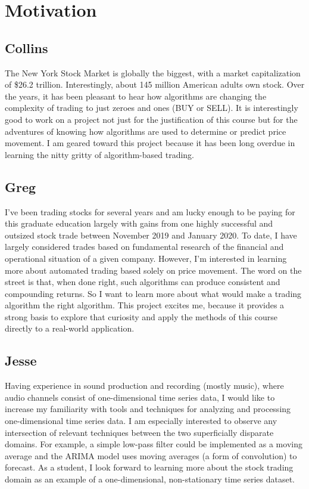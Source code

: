 \documentclass[12pt,english]{article}
\begin{document}
\section*{Motivation}
\subsection*{Collins}
The New York Stock Market is globally the biggest, with a market capitalization of \$26.2 trillion. Interestingly, about 145 million American adults own stock. Over the years, it has been pleasant to hear how algorithms are changing the complexity of trading to just zeroes and ones (BUY or SELL). It is interestingly good to work on a project not just for the justification of this course but for the adventures of knowing how algorithms are used to determine or predict price movement. I am geared toward this project because it has been long overdue in learning the nitty gritty of algorithm-based trading.
\subsection*{Greg}
I’ve been trading stocks for several years and am lucky enough to be paying for this graduate education largely with gains from one highly successful and outsized stock trade between November 2019 and January 2020. To date, I have largely considered trades based on fundamental research of the financial and operational situation of a given company. However, I’m interested in learning more about automated trading based solely on price movement. The word on the street is that, when done right, such algorithms can produce consistent and compounding returns. So I want to learn more about what would make a trading algorithm the right algorithm. This project excites me, because it provides a strong basis to explore that curiosity and apply the methods of this course directly to a real-world application.
\subsection*{Jesse}
Having experience in sound production and recording (mostly music), where audio channels consist of one-dimensional time series data, I would like to increase my familiarity with tools and techniques for analyzing and processing one-dimensional time series data. I am especially interested to observe any intersection of relevant techniques between the two superficially disparate domains. For example, a simple low-pass filter could be implemented as a moving average and the ARIMA model uses moving averages (a form of convolution) to forecast. As a student, I look forward to learning more about the stock trading domain as an example of a one-dimensional, non-stationary time series dataset.
\newpage
\end{document}
